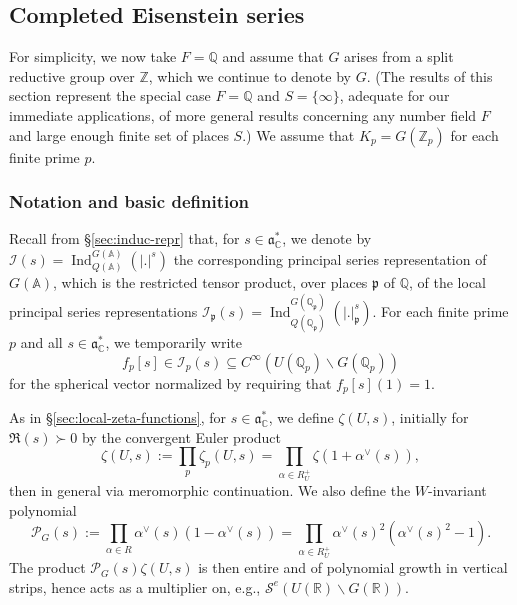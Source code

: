 \documentclass[reqno]{amsart}
\DeclareMathOperator{\Ind}{Ind}
\theoremstyle{plain} \newtheorem{theorem} {Theorem}
\theoremstyle{definition} \newtheorem{definition} [theorem] {Definition}
\theoremstyle{itplain} %
\numberwithin{equation}{section}
\numberwithin{theorem}{section}
\begin{document}
\subsection{Completed Eisenstein series}\label{sec:compl-eisenst-seri}
For simplicity, we now take $F = \mathbb{Q}$ and assume that $G$ arises from a split reductive group over $\mathbb{Z}$, which we continue to denote by $G$.  (The results of this section represent the special case $F = \mathbb{Q}$ and $S = \{\infty\}$, adequate for our immediate applications, of more general results concerning any number field $F$ and large enough finite set of places $S$.)  We assume that $K_p = G(\mathbb{Z}_p)$ for each finite prime $p$.

\subsubsection{Notation and basic definition}\label{sec:notat-basic-defin}
Recall from \S\ref{sec:induc-repr} that, for $s \in \mathfrak{a}_{\mathbb{C}}^*$, we denote by $\mathcal{I}(s) = \Ind_{Q(\mathbb{A})}^{G(\mathbb{A})} (|.|^s)$ the corresponding principal series representation of $G(\mathbb{A})$, which is the restricted tensor product, over places $\mathfrak{p}$ of $\mathbb{Q}$, of the local principal series representations $\mathcal{I}_\mathfrak{p}(s) = \Ind_{Q(\mathbb{Q}_\mathfrak{p})}^{G(\mathbb{Q}_\mathfrak{p})}(|.|_{\mathfrak{p}}^s)$.  For each finite prime $p$ and all $s \in \mathfrak{a}_{\mathbb{C}}^*$, we temporarily write
\begin{equation}\label{eq:holomorphic-families-f-p-of-s}
  f_p[s] \in \mathcal{I}_p(s) \subseteq C^\infty(U(\mathbb{Q}_p) \backslash G(\mathbb{Q}_p))
\end{equation}
for the spherical vector normalized by requiring that $f_p[s](1) = 1$.

As in \S\ref{sec:local-zeta-functions}, for $s \in \mathfrak{a}_{\mathbb{C}}^*$, we define $\zeta(U,s)$, initially for $\Re(s) \succ 0$ by the convergent Euler product 
\begin{equation}\label{eq:zeta-U-s-global-over-Z}
  \zeta(U,s) :=
  \prod_p
  \zeta_p(U,s)
  =
  \prod_{\alpha \in R_U^+}
  \zeta(1 + \alpha^\vee(s)),
\end{equation}
then in general via meromorphic continuation.  We also define the $W$-invariant polynomial 
\begin{equation*}
  \mathcal{P}_G(s)
  :=
  \prod_{\alpha \in R}
  \alpha^\vee(s)
  (1 - \alpha^\vee(s))
  =
  \prod_{\alpha \in R_U^+}
  \alpha^\vee(s)^2
  (\alpha^\vee(s)^2 - 1).
\end{equation*}
The product $\mathcal{P}_G(s) \zeta(U,s)$ is then entire and of polynomial growth in vertical strips, hence acts as a multiplier on, e.g., $\mathcal{S}^e(U(\mathbb{R}) \backslash G(\mathbb{R}))$.
\end{document}
